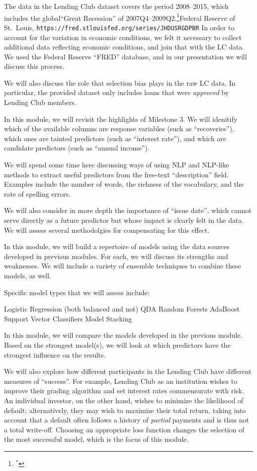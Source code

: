 The data in the Lending Club dataset covers the period 2008--2015, which includes the global\break ``Great Recession'' of 2007{\sc Q}4--2009{\sc Q}2.\footnote{$^*$}{Federal Reserve of St.~Louis, {\tt https://fred.stlouisfed.org/series/JHDUSRGDPBR}} In order to account for the variation in economic conditions, we felt it necessary to collect additional data reflecting economic conditions, and join that with the LC data. We used the Federal Reserve ``FRED'' database, and in our presentation we will discuss this process.

We will also discuss the role that selection bias plays in the raw LC data. In particular, the provided dataset only includes loans that were {\it approved} by Lending Club members.

In this module, we will revisit the highlights of Milestone 3. We will idenitify which of the available columns are response variables (such as ``recoveries''), which ones are tainted predictors (such as ``interest rate''), and which are candidate predictors (such as ``annual income'').

We will spend some time here discussing ways of using NLP and NLP-like methods to extract useful predictors from the free-text ``description'' field. Examples include the number of words, the richness of the vocabulary, and the rate of spelling errors.

We will also consider in more depth the importance of ``issue date'', which cannot serve directly as a future predictor but whose impact is clearly felt in the data. We will assess several methodolgies for compensating for this effect.

In this module, we will build a repertoire of models using the data sources developed in previous modules. For each, we will discuss its strengths and weaknesses. We will include a variety of ensemble techniques to combine these models, as well.

Specific model types that we will assess include:

\* Logistic Regression (both balanced and not)
\* QDA
\* Random Forests
\* AdaBoost
\* Support Vector Classifiers
\* Model Stacking

In this module, we will compare the models developed in the previous module. Based on the strongest model(s), we will look at which predictors have the strongest influence on the results.

We will also explore how different participants in the Lending Club have different measures of ``success''. For example, Lending Club as an institution wishes to improve their grading algorithm and set interest rates commensurate with risk. An individual investor, on the other hand, wishes to minimize the likelihood of default; alternatively, they may wish to maximize their total return, taking into account that a default often follows a history of {\it partial} payments and is thus not a total write-off. Choosing an appropriate loss function changes the selection of the most successful model, which is the focus of this module.

